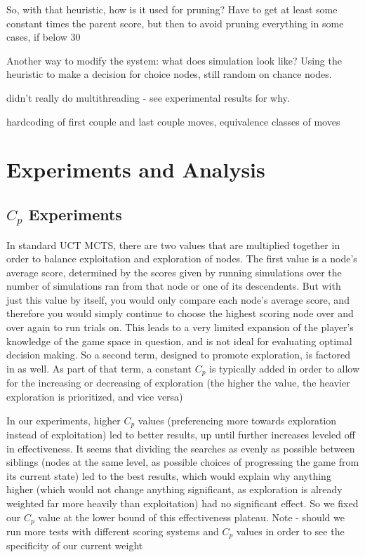 \documentclass[letterpaper]{article}
\begin{document}
So, with that heuristic, how is it used for pruning? Have to get at least some constant times the parent score, but then to avoid pruning everything in some cases, if below 30%

Another way to modify the system: what does simulation look like? Using the heuristic to make a decision for choice nodes, still random on chance nodes.

didn't really do multithreading - see experimental results for why.

hardcoding of first couple and last couple moves, equivalence classes of moves


\section{Experiments and Analysis}

\subsection{$C_p$ Experiments}
In standard UCT MCTS, there are two values that are multiplied together in order to balance exploitation and exploration of nodes. The first value is a node’s average score, determined by the scores given by running simulations over the number of simulations ran from that node or one of its descendents. But with just this value by itself, you would only compare each node’s average score, and therefore you would simply continue to choose the highest scoring node over and over again to run trials on. This leads to a very limited expansion of the player’s knowledge of the game space in question, and is not ideal for evaluating optimal decision making. So a second term, designed to promote exploration, is factored in as well. As part of that term, a constant $C_p$ is typically added in order to allow for the increasing or decreasing of exploration (the higher the value, the heavier exploration is prioritized, and vice versa)

In our experiments, higher $C_p$ values (preferencing more towards exploration instead of exploitation) led to better results, up until further increases leveled off in effectiveness. It seems that dividing the searches as evenly as possible between siblings (nodes at the same level, as possible choices of progressing the game from its current state) led to the best results, which would explain why anything higher (which would not change anything significant, as exploration is already weighted far more heavily than exploitation) had no significant effect. So we fixed our $C_p$ value at the lower bound of this effectiveness plateau.
Note - should we run more tests with different scoring systems and $C_p$ values in order to see the specificity of our current weight
\end{document}
